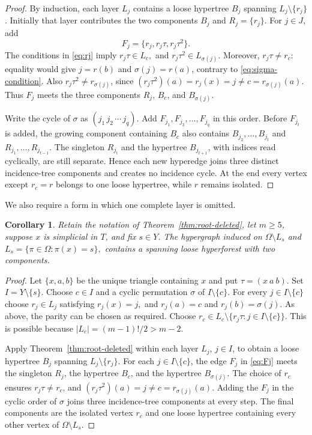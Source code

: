 \documentclass[4pt]{article} %
\newtheorem{corollary}[theorem]{Corollary}
\begin{document}
\begin{proof}
By induction, each layer $L_j$ contains a loose hypertree $B_j$ spanning
$L_j\setminus\{r_j\}$. Initially that layer contributes the two components
$B_j$ and $R_j=\{r_j\}$. For $j\in J$, add
\begin{equation}\label{eq:Fj}
 F_j=\{r_j,r_j\tau,r_j\tau^2\}.
\end{equation}
The conditions in \eqref{eq:rj} imply
$
 r_j\tau\in L_c,$ and $ r_j\tau^2\in L_{\sigma(j)}.
$
Moreover, $r_j\tau\neq r_c$: equality would give
$j=r(b)$ and $\sigma(j)=r(a)$, contrary to
\eqref{eq:sigma-condition}. Also $r_j\tau^2\neq r_{\sigma(j)}$, since
$
 (r_j\tau^2)(a)=r_j(x)=j\neq c=r_{\sigma(j)}(a).
$
Thus $F_j$ meets the three components $R_j$, $B_c$, and
$B_{\sigma(j)}$.

Write the cycle of $\sigma$ as $(j_1\,j_2\,\cdots\,j_q)$. Add
$F_{j_1},F_{j_2},\ldots,F_{j_q}$ in this order. Before $F_{j_t}$ is
added, the growing component containing $B_c$ also contains
$B_{j_2},\ldots,B_{j_t}$ and $R_{j_1},\ldots,R_{j_{t-1}}$. The singleton
$R_{j_t}$ and the hypertree $B_{j_{t+1}}$, with indices read cyclically, are
still separate. Hence each new hyperedge joins three distinct
incidence-tree components and creates no incidence cycle. At the end every
vertex except $r_c=r$ belongs to one loose hypertree, while $r$ remains
isolated.
\end{proof}

We also require a form in which one complete layer is omitted.

\begin{corollary}\label{cor:layer-deletion}
Retain the notation of Theorem~\ref{thm:root-deleted}, let $m\geq5$, suppose
$x$ is simplicial in $T$, and fix $s\in Y$. The hypergraph induced on
$
 \Omega\setminus L_s$ and $
 L_s=\{\pi\in\Omega:\pi(x)=s\},
$
contains a spanning loose hyperforest with two components.
\end{corollary}

\begin{proof}
Let $\{x,a,b\}$ be the unique triangle containing $x$ and put
$\tau=(x\ a\ b)$. Set $I=Y\setminus\{s\}$. Choose $c\in I$ and a cyclic
permutation $\sigma$ of $I\setminus\{c\}$. For every
$j\in I\setminus\{c\}$ choose $r_j\in L_j$ satisfying
$
 r_j(x)=j,$ and $ r_j(a)=c $ and $ r_j(b)=\sigma(j).
$
As above, the parity can be chosen as required. Choose
$
 r_c\in L_c\setminus
 \{r_j\tau:j\in I\setminus\{c\}\}.
$
This is possible because $|L_c|=(m-1)!/2>m-2$.

Apply Theorem~\ref{thm:root-deleted} within each layer $L_j$, $j\in I$, to
obtain a loose hypertree $B_j$ spanning $L_j\setminus\{r_j\}$. For each
$j\in I\setminus\{c\}$, the edge $F_j$ in \eqref{eq:Fj} meets the singleton
$R_j$, the hypertree $B_c$, and the hypertree $B_{\sigma(j)}$. The choice of
$r_c$ ensures $r_j\tau\neq r_c$, and
$
 (r_j\tau^2)(a)=j\neq c=r_{\sigma(j)}(a).
$
Adding the $F_j$ in the cyclic order of $\sigma$ joins three incidence-tree
components at every step. The final components are the isolated vertex
$r_c$ and one loose hypertree containing every other vertex of
$\Omega\setminus L_s$.
\end{proof}
\end{document}

